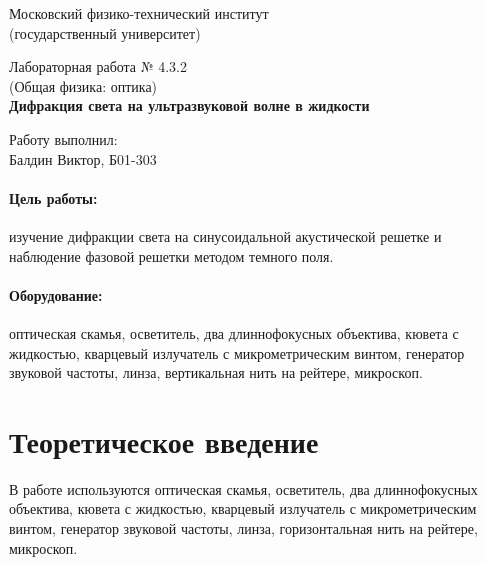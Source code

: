 \documentclass[12pt]{article}
\begin{document}
	\begin{titlepage}
	\begin{center}
		\large 	Московский физико-технический институт \\
		(государственный университет) \\

		\vspace{0.2cm}

		\vspace{4.5cm}
		Лабораторная работа № 4.3.2 \\ \vspace{0.2cm}
		\large (Общая физика: оптика) \\ \vspace{0.2cm}
		\LARGE \textbf{Дифракция света на ультразвуковой волне в жидкости}
	\end{center}
	\vspace{2.3cm} \large

	\begin{center}
		Работу выполнил: \\
		Балдин Виктор,
		Б01-303
		\vspace{10mm}

	\end{center}


\end{titlepage}

	\paragraph*{Цель работы:} изучение дифракции света на синусоидальной акустической решетке и
	наблюдение фазовой решетки методом темного поля.

	\paragraph*{Оборудование:} оптическая скамья, осветитель, два длиннофокусных объектива, кювета с жидкостью, кварцевый излучатель с микрометрическим винтом, генератор звуковой частоты, линза, вертикальная нить на рейтере, микроскоп.

	\section{Теоретическое введение}

	В работе используются оптическая скамья, осветитель, два длиннофокусных объектива, кювета с жидкостью, кварцевый излучатель с микрометрическим винтом, генератор звуковой частоты, линза, горизонтальная нить на рейтере, микроскоп.
\end{document}
